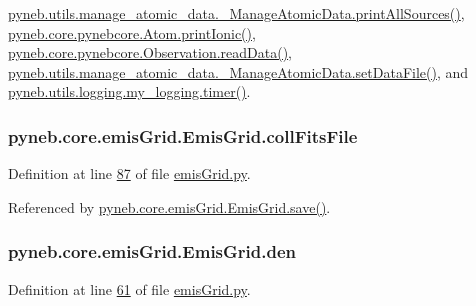 \hyperlink{manage__atomic__data_8py_source_l00431}{pyneb.\-utils.\-manage\-\_\-atomic\-\_\-data.\-\_\-\-Manage\-Atomic\-Data.\-print\-All\-Sources()}, \hyperlink{pynebcore_8py_source_l02233}{pyneb.\-core.\-pynebcore.\-Atom.\-print\-Ionic()}, \hyperlink{pynebcore_8py_source_l03711}{pyneb.\-core.\-pynebcore.\-Observation.\-read\-Data()}, \hyperlink{manage__atomic__data_8py_source_l00380}{pyneb.\-utils.\-manage\-\_\-atomic\-\_\-data.\-\_\-\-Manage\-Atomic\-Data.\-set\-Data\-File()}, and \hyperlink{logging_8py_source_l00115}{pyneb.\-utils.\-logging.\-my\-\_\-logging.\-timer()}.

\hypertarget{classpyneb_1_1core_1_1emis_grid_1_1_emis_grid_ad9f51a3439ea7455aaf790887fc78b3c}{
\subsubsection[{coll\-Fits\-File}]{\setlength{\rightskip}{0pt plus 5cm}pyneb.\-core.\-emis\-Grid.\-Emis\-Grid.\-coll\-Fits\-File}}\label{classpyneb_1_1core_1_1emis_grid_1_1_emis_grid_ad9f51a3439ea7455aaf790887fc78b3c}


Definition at line \hyperlink{emis_grid_8py_source_l00087}{87} of file \hyperlink{emis_grid_8py_source}{emis\-Grid.\-py}.



Referenced by \hyperlink{emis_grid_8py_source_l00099}{pyneb.\-core.\-emis\-Grid.\-Emis\-Grid.\-save()}.

\hypertarget{classpyneb_1_1core_1_1emis_grid_1_1_emis_grid_ac393173ea0ffbfdffb4c095fa6acada1}{
\subsubsection[{den}]{\setlength{\rightskip}{0pt plus 5cm}pyneb.\-core.\-emis\-Grid.\-Emis\-Grid.\-den}}\label{classpyneb_1_1core_1_1emis_grid_1_1_emis_grid_ac393173ea0ffbfdffb4c095fa6acada1}


Definition at line \hyperlink{emis_grid_8py_source_l00061}{61} of file \hyperlink{emis_grid_8py_source}{emis\-Grid.\-py}.



